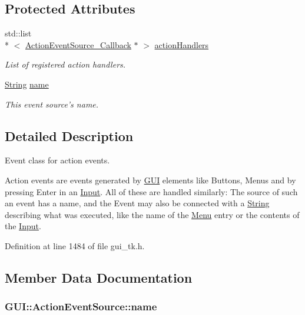 \subsection*{Protected Attributes}
\begin{DoxyCompactItemize}
\item 
\hypertarget{classGUI_1_1ActionEventSource_a9cd3562084ba5fa2b3d9d72ac3fa1baa}{std\-::list\\*
$<$ \hyperlink{structGUI_1_1ActionEventSource__Callback}{Action\-Event\-Source\-\_\-\-Callback} $\ast$ $>$ \hyperlink{classGUI_1_1ActionEventSource_a9cd3562084ba5fa2b3d9d72ac3fa1baa}{action\-Handlers}}\label{classGUI_1_1ActionEventSource_a9cd3562084ba5fa2b3d9d72ac3fa1baa}

\begin{DoxyCompactList}\small\item\em List of registered action handlers. \end{DoxyCompactList}\item 
\hyperlink{classGUI_1_1String}{String} \hyperlink{classGUI_1_1ActionEventSource_ab494e66ccff6518e1cabe747df2173f8}{name}
\begin{DoxyCompactList}\small\item\em This event source's name. \end{DoxyCompactList}\end{DoxyCompactItemize}


\subsection{Detailed Description}
Event class for action events. 

Action events are events generated by \hyperlink{namespaceGUI}{G\-U\-I} elements like Buttons, Menus and by pressing Enter in an \hyperlink{classGUI_1_1Input}{Input}. All of these are handled similarly\-: The source of such an event has a name, and the Event may also be connected with a \hyperlink{classGUI_1_1String}{String} describing what was executed, like the name of the \hyperlink{classGUI_1_1Menu}{Menu} entry or the contents of the \hyperlink{classGUI_1_1Input}{Input}. 

Definition at line 1484 of file gui\-\_\-tk.\-h.



\subsection{Member Data Documentation}
\hypertarget{classGUI_1_1ActionEventSource_ab494e66ccff6518e1cabe747df2173f8}{
\subsubsection[{name}]{ {\bf G\-U\-I\-::\-Action\-Event\-Source\-::name}}}\label{classGUI_1_1ActionEventSource_ab494e66ccff6518e1cabe747df2173f8}



